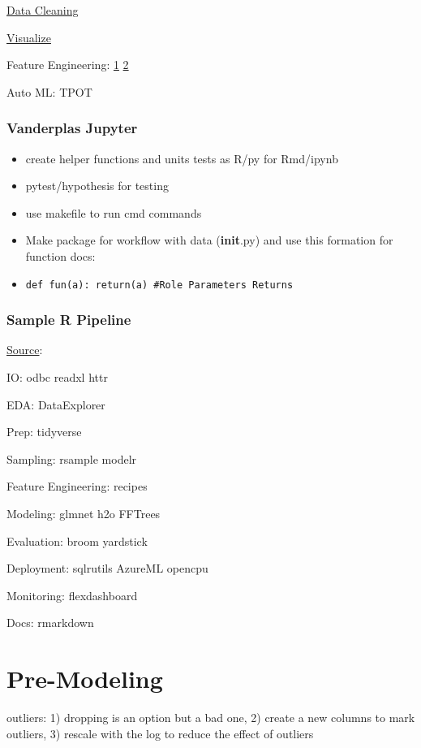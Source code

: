 \documentclass[]{book}
\begin{document}
\href{http://www.dataland.ai/index.php}{Data Cleaning}

\href{http://holoviews.org}{Visualize}

Feature Engineering: \href{https://www.featuretools.com}{1} \textbar{}
\href{https://www.featurelabs.com/}{2}

Auto ML: TPOT

\subsection{Vanderplas Jupyter}\label{vanderplas-jupyter}

\begin{itemize}
\item
  create helper functions and units tests as R/py for Rmd/ipynb
\item
  pytest/hypothesis for testing
\item
  use makefile to run cmd commands
\item
  Make package for workflow with data (\textbf{init}.py) and use this
  formation for function docs:
\item
  \texttt{def\ fun(a):\ return(a)\ \#Role\ Parameters\ Returns}
\end{itemize}

\subsection{Sample R Pipeline}\label{sample-r-pipeline}

\href{https://mobile.twitter.com/TheStephLocke/status/990251709531344896}{Source}:

IO: odbc readxl httr

EDA: DataExplorer

Prep: tidyverse

Sampling: rsample modelr

Feature Engineering: recipes

Modeling: glmnet h2o FFTrees

Evaluation: broom yardstick

Deployment: sqlrutils AzureML opencpu

Monitoring: flexdashboard

Docs: rmarkdown

\chapter{Pre-Modeling}\label{pre-modeling}

outliers: 1) dropping is an option but a bad one, 2) create a new
columns to mark outliers, 3) rescale with the log to reduce the effect
of outliers
\end{document}

